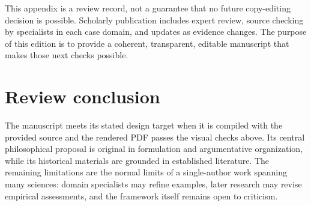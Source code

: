This appendix is a review record, not a guarantee that no future copy-editing
decision is possible. Scholarly publication includes expert review, source
checking by specialists in each case domain, and updates as evidence changes.
The purpose of this edition is to provide a coherent, transparent, editable
manuscript that makes those next checks possible.

\section*{Review conclusion}

The manuscript meets its stated design target when it is compiled with the
provided source and the rendered PDF passes the visual checks above. Its
central philosophical proposal is original in formulation and argumentative
organization, while its historical materials are grounded in established
literature. The remaining limitations are the normal limits of a single-author
work spanning many sciences: domain specialists may refine examples, later
research may revise empirical assessments, and the framework itself remains
open to criticism.

